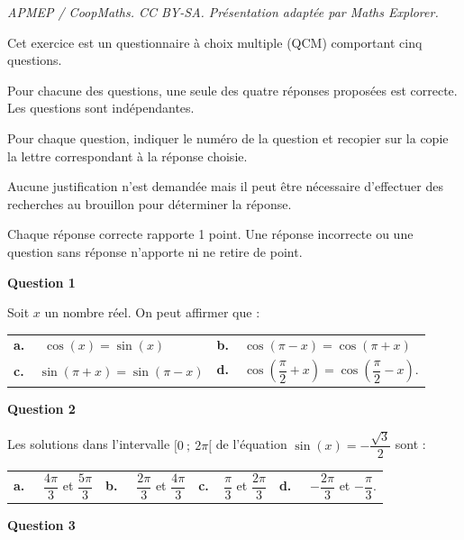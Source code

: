 \documentclass[10pt]{article}
\begin{document}
\noindent\textit{APMEP / CoopMaths. CC BY-SA. Présentation adaptée par Maths Explorer.}\par\medskip
\medskip

Cet exercice est un questionnaire à choix multiple (QCM) comportant cinq questions.

Pour chacune des questions, une seule des quatre réponses proposées est correcte. Les questions
sont indépendantes.

Pour chaque question, indiquer le numéro de la question et recopier sur la copie la lettre
correspondant à la réponse choisie.

Aucune justification n'est demandée mais il peut être nécessaire d'effectuer des recherches au
brouillon pour déterminer la réponse.

Chaque réponse correcte rapporte 1 point. Une réponse incorrecte ou une question sans réponse
n'apporte ni ne retire de point.

\medskip

\textbf{Question 1}

\medskip 

Soit $x$ un nombre réel. On peut affirmer que :

\medskip 
 
\begin{tabularx}{\linewidth}{*{2}{X}}
\textbf{a.~~} $\cos(x)=\sin(x)$ & \textbf{b.~~}$\cos(\pi-x)=\cos(\pi+x)$ \\\textbf{c.~~}$\sin(\pi+x)=\sin(\pi-x) $& \textbf{d.~~}$ \cos \left(\dfrac{\pi}{2}+ x\right) = \cos \left(\dfrac{\pi}{2}- x\right) $.
\end{tabularx}


\medskip

\textbf{Question 2}

\medskip 

Les solutions dans l'intervalle $[0~;~2\pi[$ de l'équation $\sin(x) = -\dfrac{\sqrt{3}}{2}$
 sont :
 
 \medskip
 
\begin{tabularx}{\linewidth}{*{4}{X}}
\textbf{a.~~} $\dfrac{4\pi}{3}$ et $\dfrac{5\pi}{3} $ &\textbf{b.~~} $\dfrac{2\pi}{3}$ et $\dfrac{4\pi}{3} $&\textbf{c.~~}$ \dfrac{\pi}{3}$ et $\dfrac{2\pi}{3}$& \textbf{d.~~} $-\dfrac{2\pi}{3}$ et $- \dfrac{\pi}{3}  $.
\end{tabularx}


\medskip

\textbf{Question 3}

\medskip 
\end{document}
